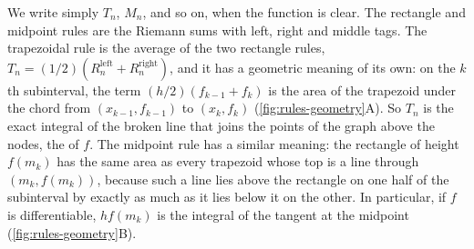 We write simply $T_n$, $M_n$, and so on, when the function is clear. The rectangle and midpoint rules are the Riemann sums with left, right and middle tags. The trapezoidal rule is the average of the two rectangle rules, $T_n=(1/2)(R^{\mathrm{left}}_n+R^{\mathrm{right}}_n)$, and it has a geometric meaning of its own: on the $k$th subinterval, the term $(h/2)(f_{k-1}+f_k)$ is the area of the trapezoid under the chord from $(x_{k-1},f_{k-1})$ to $(x_k,f_k)$ (\cref{fig:rules-geometry}A). So $T_n$ is the exact integral of the broken line that joins the points of the graph above the nodes, the  of $f$. The midpoint rule has a similar meaning: the rectangle of height $f(m_k)$ has the same area as every trapezoid whose top is a line through $(m_k,f(m_k))$, because such a line lies above the rectangle on one half of the subinterval by exactly as much as it lies below it on the other. In particular, if $f$ is differentiable, $hf(m_k)$ is the integral of the tangent at the midpoint (\cref{fig:rules-geometry}B).

